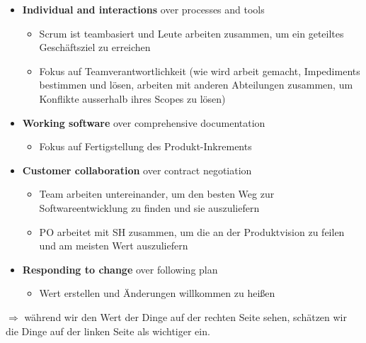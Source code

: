 \begin{itemize}
  \item \textbf{Individual and interactions} over processes and tools
    \begin{itemize}
      \item Scrum ist teambasiert und Leute arbeiten zusammen, um ein geteiltes Geschäftsziel zu
        erreichen
      \item Fokus auf Teamverantwortlichkeit (wie wird arbeit gemacht, Impediments bestimmen und
        lösen, arbeiten mit anderen Abteilungen zusammen, um Konflikte ausserhalb ihres Scopes zu
        lösen)
    \end{itemize}
  \item \textbf{Working software} over comprehensive documentation
    \begin{itemize}
      \item Fokus auf Fertigstellung des Produkt-Inkrements
    \end{itemize}
  \item \textbf{Customer collaboration} over contract negotiation
    \begin{itemize}
      \item Team arbeiten untereinander, um den besten Weg zur Softwareentwicklung zu finden und sie
        auszuliefern
      \item PO arbeitet mit SH zusammen, um die an der Produktvision zu feilen und am meisten Wert
        auszuliefern
    \end{itemize}
  \item \textbf{Responding to change} over following plan
    \begin{itemize}
      \item Wert erstellen und Änderungen willkommen zu heißen
    \end{itemize}
\end{itemize}


$\Rightarrow$ während wir den Wert der Dinge auf der rechten Seite sehen, schätzen wir die
Dinge auf der linken Seite als wichtiger ein.


